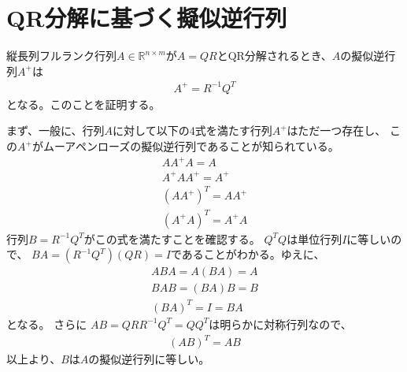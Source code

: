 \documentclass{jarticle}
\begin{document}
\section{QR分解に基づく擬似逆行列}
縦長列フルランク行列$A\in \mathbb{R}^{n\times m}$が$A=QR$とQR分解されるとき、$A$の擬似逆行列$A^{+}$は
\begin{align}
A^{+} = R^{-1}Q^T
\end{align}
となる。このことを証明する。

まず、一般に、行列$A$に対して以下の4式を満たす行列$A^{+}$はただ一つ存在し、
この$A^{+}$がムーアペンローズの擬似逆行列であることが知られている。
\begin{align}
AA^{+}A = A
\\
A^{+}AA^{+} = A^{+}
\\
(AA^{+})^T = AA^{+}
\\
(A^{+}A)^T = A^{+}A
\end{align}
行列$B=R^{-1}Q^T$がこの式を満たすことを確認する。
$Q^TQ$は単位行列$I$に等しいので、
$BA=(R^{-1}Q^T)(QR)=I$であることがわかる。ゆえに、
\begin{align}
ABA = A(BA) = A
\\
BAB = (BA)B = B
\\
(BA)^T = I = BA
\end{align}
となる。
さらに
$AB=QRR^{-1}Q^T=QQ^T$は明らかに対称行列なので、
\begin{align}
(AB)^T = AB
\end{align}
以上より、$B$は$A$の擬似逆行列に等しい。
\end{document}
